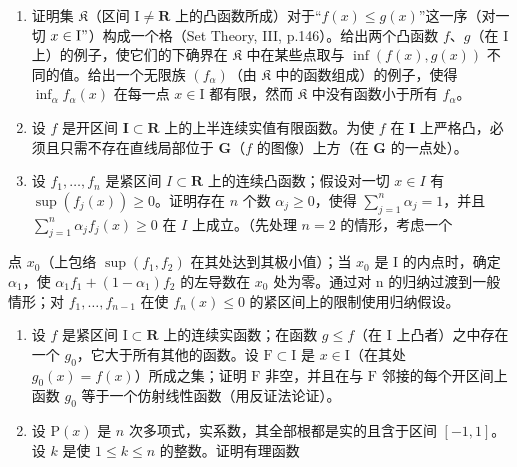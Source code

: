 \begin{enumerate}
\def\labelenumi{\arabic{enumi})}
\setcounter{enumi}{19}
\item
  证明集 \(\mathfrak{K}\)（区间 \(\mathrm{I} \neq \mathbf{R}\) 上的凸函数所成）对于“\(f(x) \leqslant g(x)\)”这一序（对一切 \(x \in \mathrm{I}"\)）构成一个格（Set Theory, III, p.146）。给出两个凸函数 \(f\)、\(g\)（在 \(\mathrm{I}\) 上）的例子，使它们的下确界在 \(\mathfrak{K}\) 中在某些点取与 \(\inf(f(x), g(x))\) 不同的值。给出一个无限族 \((f_{\alpha})\)（由 \(\mathfrak{K}\) 中的函数组成）的例子，使得 \(\inf_{\alpha} f_{\alpha}(x)\) 在每一点 \(x \in \mathrm{I}\) 都有限，然而 \(\mathfrak{K}\) 中没有函数小于所有 \(f_{\alpha}\)。
\item
  设 \(f\) 是开区间 \(\mathbf{I} \subset \mathbf{R}\) 上的上半连续实值有限函数。为使 \(f\) 在 \(\mathbf{I}\) 上严格凸，必须且只需不存在直线局部位于 \(\mathbf{G}\)（\(f\) 的图像）上方（在 \(\mathbf{G}\) 的一点处）。
\item
  设 \(f_{1}, \ldots, f_{n}\) 是紧区间 \(I \subset \mathbf{R}\) 上的连续凸函数；假设对一切 \(x \in I\) 有 \(\sup(f_{j}(x)) \geqslant 0\)。证明存在 \(n\) 个数 \(\alpha_{j} \geqslant 0\)，使得 \(\sum_{j=1}^{n} \alpha_{j} = 1\)，并且 \(\sum_{j=1}^{n} \alpha_{j} f_{j}(x) \geqslant 0\) 在 \(I\) 上成立。（先处理 \(n = 2\) 的情形，考虑一个
\end{enumerate}

点 \(x_{0}\)（上包络 \(\sup(f_{1}, f_{2})\) 在其处达到其极小值）；当 \(x_{0}\) 是 I 的内点时，确定 \(\alpha_{1}\)，使 \(\alpha_{1}f_{1} + (1 - \alpha_{1})f_{2}\) 的左导数在 \(x_{0}\) 处为零。通过对 n 的归纳过渡到一般情形；对 \(f_{1}, \ldots, f_{n-1}\) 在使 \(f_{n}(x) \leqslant 0\) 的紧区间上的限制使用归纳假设。

\begin{enumerate}
\def\labelenumi{\arabic{enumi})}
\setcounter{enumi}{22}
\item
  设 \(f\) 是紧区间 \(\mathrm{I} \subset \mathbf{R}\) 上的连续实函数；在函数 \(g \leqslant f\)（在 \(\mathrm{I}\) 上凸者）之中存在一个 \(g_0\)，它大于所有其他的函数。设 \(\mathrm{F} \subset \mathrm{I}\) 是 \(x \in \mathrm{I}\)（在其处 \(g_0(x) = f(x)\)）所成之集；证明 \(\mathrm{F}\) 非空，并且在与 \(\mathrm{F}\) 邻接的每个开区间上函数 \(g_0\) 等于一个仿射线性函数（用反证法论证）。
\item
  设 \(\mathrm{P}(x)\) 是 \(n\) 次多项式，实系数，其全部根都是实的且含于区间 \([-1, 1]\)。设 \(k\) 是使 \(1 \leqslant k \leqslant n\) 的整数。证明有理函数
\end{enumerate}

